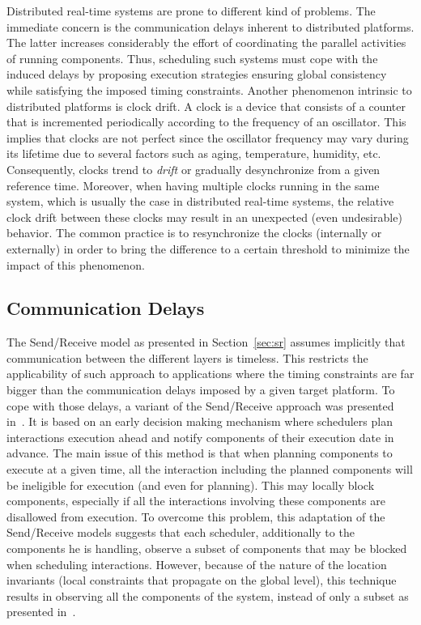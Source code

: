 Distributed real-time systems are prone to different kind of problems. The immediate concern 
is the communication delays inherent to distributed platforms. The latter increases considerably
the effort of coordinating the parallel activities of running components. Thus, scheduling
such systems must cope with the induced delays by proposing execution strategies ensuring 
global consistency while satisfying the imposed timing constraints.
Another phenomenon intrinsic to distributed platforms is clock drift. A clock is a device
that consists of a counter that is incremented periodically according to the frequency of 
an oscillator. This implies that clocks are not perfect since the oscillator frequency may
vary during its lifetime due to several factors such as aging, temperature, humidity, etc.
Consequently, clocks trend to \emph{drift} or gradually desynchronize from a given reference 
time. Moreover, when having multiple clocks running in the same system, which is usually the
case in distributed real-time systems, the relative clock drift between these clocks
may result in an unexpected (even undesirable) behavior. The common practice is to 
resynchronize the clocks (internally or externally) in order to bring the difference to 
a certain threshold to minimize the impact of this phenomenon. 

\subsection{Communication Delays}

The Send/Receive model as presented in Section~\ref{sec:sr} assumes implicitly that 
communication between the different layers is timeless. This restricts the applicability
of such approach to applications where the timing constraints are far bigger than the 
communication delays imposed by a given target platform.  
To cope with those delays, a variant of the Send/Receive approach was presented in~\cite{}. 
It is based on an early decision making mechanism where schedulers plan interactions execution 
ahead and notify components of their execution date in advance. 
The main issue of this method is that when planning components to execute at a given time,
all the interaction including the planned components will be ineligible for execution (and even
for planning). This may locally block components, especially if all the interactions 
involving these components are disallowed from execution. To overcome this problem,
this adaptation of the Send/Receive models suggests that each scheduler, additionally to the
components he is handling, observe a subset of components that may be blocked when 
scheduling interactions. However, because of the nature of the location invariants (local
constraints that propagate on the global level), this technique results in observing
all the components of the system, instead of only a subset as presented in~\cite{}.


